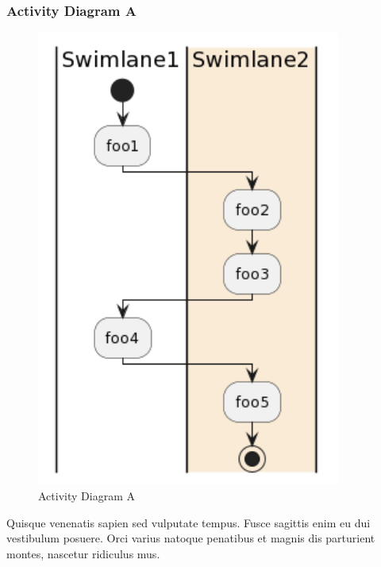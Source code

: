 \subsubsection{Activity Diagram A}
\begin{figure}[H]
    \centering
    \includegraphics[width=10cm]{assets/pics/dummy-activity-diagram.png}
    \caption{Activity Diagram A}
    \label{fig:activityDiagramA}
\end{figure}

Quisque venenatis sapien sed vulputate tempus. Fusce sagittis enim eu dui vestibulum posuere. Orci varius natoque penatibus et magnis dis parturient montes, nascetur ridiculus mus.

